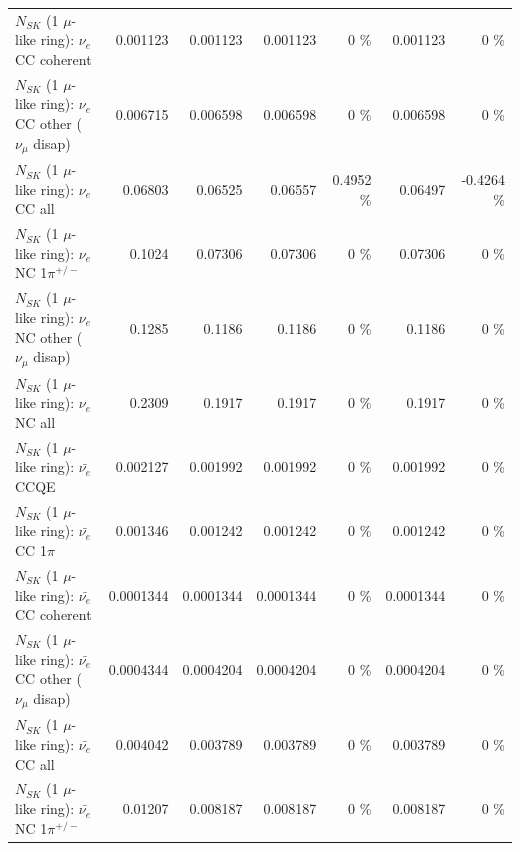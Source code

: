 \begin{table}
\begin{tabular}{| l | r | r | r  r | r  r |}
                               $N_{SK}$ (1 $\mu$-like ring): $\nu_e$ CC coherent &        0.001123 &        0.001123 &        0.001123 &        0 \%  &        0.001123 &        0 \%  \\ 
                $N_{SK}$ (1 $\mu$-like ring): $\nu_e$ CC other ($\nu_\mu$ disap) &        0.006715 &        0.006598 &        0.006598 &        0 \%  &        0.006598 &        0 \%  \\ 
                                  $N_{SK}$ (1 $\mu$-like ring): $\nu_{e}$ CC all &         0.06803 &         0.06525 &         0.06557 &   0.4952 \%  &         0.06497 &  -0.4264 \%  \\ 
\hline
                           $N_{SK}$ (1 $\mu$-like ring): $\nu_e$ NC 1$\pi^{+/-}$ &          0.1024 &         0.07306 &         0.07306 &        0 \%  &         0.07306 &        0 \%  \\ 
                $N_{SK}$ (1 $\mu$-like ring): $\nu_e$ NC other ($\nu_\mu$ disap) &          0.1285 &          0.1186 &          0.1186 &        0 \%  &          0.1186 &        0 \%  \\ 
                                  $N_{SK}$ (1 $\mu$-like ring): $\nu_{e}$ NC all &          0.2309 &          0.1917 &          0.1917 &        0 \%  &          0.1917 &        0 \%  \\ 
\hline
\hline
\hline
                                $N_{SK}$ (1 $\mu$-like ring): $\bar{\nu_e}$ CCQE &        0.002127 &        0.001992 &        0.001992 &        0 \%  &        0.001992 &        0 \%  \\ 
                           $N_{SK}$ (1 $\mu$-like ring): $\bar{\nu_e}$ CC 1$\pi$ &        0.001346 &        0.001242 &        0.001242 &        0 \%  &        0.001242 &        0 \%  \\ 
                         $N_{SK}$ (1 $\mu$-like ring): $\bar{\nu_e}$ CC coherent &       0.0001344 &       0.0001344 &       0.0001344 &        0 \%  &       0.0001344 &        0 \%  \\ 
          $N_{SK}$ (1 $\mu$-like ring): $\bar{\nu_e}$ CC other ($\nu_\mu$ disap) &       0.0004344 &       0.0004204 &       0.0004204 &        0 \%  &       0.0004204 &        0 \%  \\ 
                            $N_{SK}$ (1 $\mu$-like ring): $\bar{\nu_{e}}$ CC all &        0.004042 &        0.003789 &        0.003789 &        0 \%  &        0.003789 &        0 \%  \\ 
\hline
                     $N_{SK}$ (1 $\mu$-like ring): $\bar{\nu_e}$ NC 1$\pi^{+/-}$ &         0.01207 &        0.008187 &        0.008187 &        0 \%  &        0.008187 &        0 \%  \\ 

\end{tabular}
\end{table}
